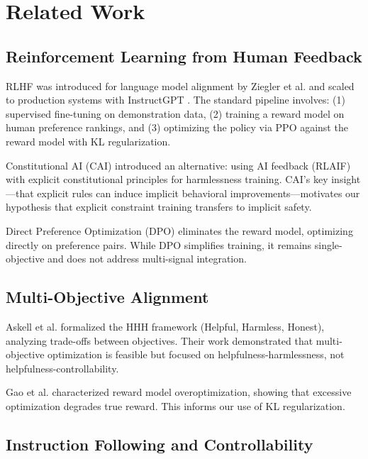 \section{Related Work}
\label{sec:related_work}

\subsection{Reinforcement Learning from Human Feedback}

RLHF was introduced for language model alignment by Ziegler et al. \citep{ziegler2019fine} and scaled to production systems with InstructGPT \citep{ouyang2022instructgpt}. The standard pipeline involves: (1) supervised fine-tuning on demonstration data, (2) training a reward model on human preference rankings, and (3) optimizing the policy via PPO against the reward model with KL regularization.

Constitutional AI (CAI) \citep{bai2022constitutional} introduced an alternative: using AI feedback (RLAIF) with explicit constitutional principles for harmlessness training. CAI's key insight---that explicit rules can induce implicit behavioral improvements---motivates our hypothesis that explicit constraint training transfers to implicit safety.

Direct Preference Optimization (DPO) \citep{rafailov2023dpo} eliminates the reward model, optimizing directly on preference pairs. While DPO simplifies training, it remains single-objective and does not address multi-signal integration.

\subsection{Multi-Objective Alignment}

Askell et al. \citep{askell2021anthropic} formalized the HHH framework (Helpful, Harmless, Honest), analyzing trade-offs between objectives. Their work demonstrated that multi-objective optimization is feasible but focused on helpfulness-harmlessness, not helpfulness-controllability.

Gao et al. \citep{gao2022scaling} characterized reward model overoptimization, showing that excessive optimization degrades true reward. This informs our use of KL regularization.

\subsection{Instruction Following and Controllability}

